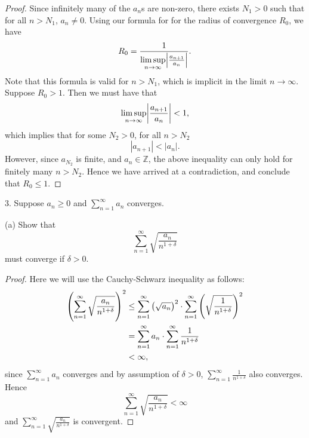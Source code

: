 \documentclass{article}
\newcommand{\Z}{\mathbb{Z}}
\begin{document}
\begin{proof}

Since infinitely many of the $a_n$s are non-zero, there exists $N_1 > 0$ such
that for all $n > N_1$, $a_n \neq 0$. Using our formula for for the radius
of convergence $R_0$, we have
%
\begin{equation*}
    R_0 = \frac{1}{\limsup\limits_{n \to \infty} \envert{\frac{a_{n + 1}}{a_n}}}
    .
\end{equation*}
%
Note that this formula is valid for $n > N_1$, which is implicit in the
limit $n \to \infty$. Suppose $R_0 > 1$. Then we must have that
%
\begin{equation*}
    \limsup_{n \to \infty} \envert{\frac{a_{n + 1}}{a_n}} < 1
    ,
\end{equation*}
%
which implies that for some $N_2 > 0$, for all $n > N_2$
%
\begin{equation*}
    |a_{n + 1}| < |a_n|
    .
\end{equation*}
%
However, since $a_{N_2}$ is finite, and $a_n \in \Z$, the above
inequality can only hold for finitely many $n > N_2$. Hence we have
arrived at a contradiction, and conclude that $R_0 \leq 1$.

\end{proof}

\newpage

3. Suppose $a_n \geq 0$ and $\sum_{n = 1}^\infty a_n$ converges.

(a) Show that
%
\begin{equation*}
    \sum_{n = 1}^\infty \sqrt{\frac{a_n}{n^{1 + \delta}}}
\end{equation*}
%
must converge if $\delta > 0$.

\begin{proof}

Here we will use the Cauchy-Schwarz inequality as follows:
%
\begin{align*}
    \del{\sum_{n = 1}^\infty \sqrt{\frac{a_n}{n^{1 + \delta}}}}^2
        &\leq
            \sum_{n = 1}^\infty \del{\sqrt{{a_n}}}^2
            \cdot
            \sum_{n = 1}^\infty \del{\sqrt{\frac{1}{n^{1 + \delta}}}}^2
            \\
        &=
            \sum_{n = 1}^\infty {a_n}
            \cdot
            \sum_{n = 1}^\infty \frac{1}{n^{1 + \delta}}
            \\
        &< \infty
        ,
\end{align*}
%
since $\sum_{n = 1}^\infty {a_n}$ converges and by assumption of $\delta
> 0$, $\sum_{n = 1}^\infty \frac{1}{n^{1 + \delta}}$ also converges. Hence
%
\begin{equation*}
    \sum_{n = 1}^\infty \sqrt{\frac{a_n}{n^{1 + \delta}}} < \infty
\end{equation*}
%
and $\sum_{n = 1}^\infty \sqrt{\frac{a_n}{n^{1 + \delta}}}$ is convergent.

\end{proof}
\end{document}
